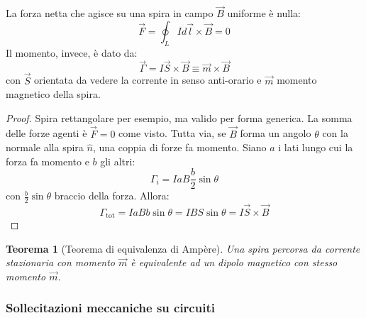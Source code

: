 \documentclass[a4paper]{scrartcl}
\numberwithin{equation}{subsection}
\theoremstyle{style1}
\newtheorem{teorema}{Teorema}[section]
\newenvironment{boxenv}[1][]{
    \begin{eqbox}[#1]
    }{
   \end{eqbox}
}
\begin{document}
La forza netta che agisce su una spira in campo $\vec{B}$ uniforme \`e nulla:
\begin{equation}
	\vec{F} = \oint_{L} I d\vec{l} \times \vec{B} =0 
\end{equation}
Il momento, invece, \`e dato da:
\begin{equation}
	\vec{\Gamma} = I\vec{S} \times \vec{B}\equiv \vec{m}\times \vec{B}
\end{equation}
con $\vec{S}$ orientata da vedere la corrente in senso anti-orario e $\vec{m}$ momento magnetico della spira.
\begin{boxenv}[]
\begin{proof}
	Spira rettangolare per esempio, ma valido per forma generica. La somma delle forze agenti \`e $\vec{F} = 0$ come visto. Tutta via, se $\vec{B}$ forma un angolo $\theta $ con la normale alla spira $\hat{n}$, una coppia di forze fa momento. Siano $a$ i lati lungo cui la forza fa momento e $b$ gli altri:
	\begin{equation}
		\Gamma_i = IaB \frac{b}{2}\sin\theta 
	\end{equation}
	con $\frac{b}{2}\sin \theta $ braccio della forza. Allora:
	\begin{equation}
\Gamma_\text{tot} = IaB b \sin \theta  = IB S \sin \theta = I \vec{S}\times \vec{B} 
	\end{equation}
\end{proof}
\end{boxenv}
\begin{teorema}
	[Teorema di equivalenza di Amp\`ere]
	Una spira percorsa da corrente stazionaria con momento $\vec{m}$ \`e equivalente ad un dipolo magnetico con stesso momento $\vec{m}$.
\end{teorema}
\subsubsection{Sollecitazioni meccaniche su circuiti}
\end{document}
